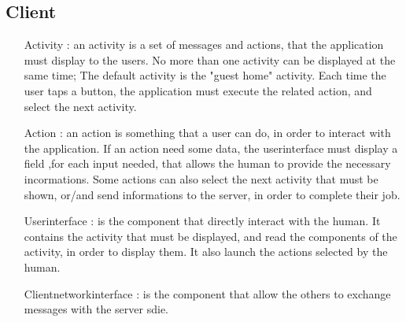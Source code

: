 	\subsection{Client}
	 \begin{itemize}
	  \item [Activity]: an activity is a set of messages and actions, that the application must display to the users.
	  No more than one activity can be displayed at the same time;
	  The default activity is the "guest home" activity. Each time the user taps a button, the application must execute
	  the related action, and select the next activity. 
	  \item [Action]: an action is something that a user can do, in order to interact with the application.
	  If an action need some data, the userinterface must display a field ,for each input needed, that allows the human
	  to provide the necessary incormations.
	  Some actions can also select the next activity that must be shown, or/and send informations to the server,
	  in order to complete their job.
	  \item [Userinterface]: is the component that directly interact with the human.
	  It contains the activity that must be displayed, and read the components of the activity, in order to display them.
	  It also launch the actions selected by the human.
	  \item[Clientnetworkinterface]: is the component that allow the others to exchange messages with the server sdie.
	 \end{itemize}
